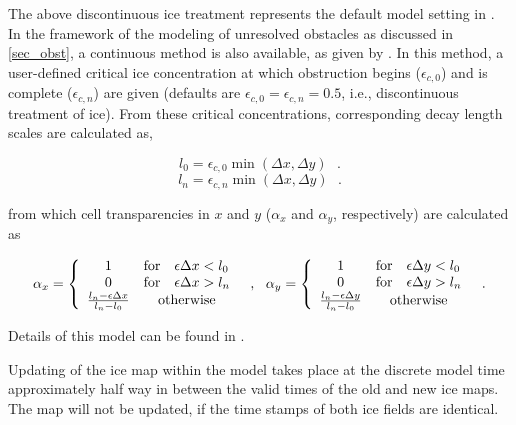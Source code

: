 The above discontinuous ice treatment represents the default model setting in
\ws. In the framework of the modeling of unresolved obstacles as discussed in
\para\ref{sec_obst}, a continuous method is also available, as given by
\cite{tol:OMOD03a}. In this method, a user-defined critical ice concentration
at which obstruction begins ($\epsilon_{c,0}$) and is complete
($\epsilon_{c,n}$) are given (defaults are $\epsilon_{c,0} = \epsilon_{c,n} =
0.5$, i.e., discontinuous treatment of ice). From these critical
concentrations, corresponding decay length scales are calculated as,

\begin{equation}
l_0 = \epsilon_{c,0} \min ( \Delta x , \Delta y )
\:\:\: . \label{eq:l0}
\end{equation}
\begin{equation}
l_n = \epsilon_{c,n} \min ( \Delta x , \Delta y )
\:\:\: . \label{eq:ln}
\end{equation}

\noindent
from which cell transparencies in $x$ and $y$ ($\alpha_x$ and $\alpha_y$,
respectively) are calculated as

\begin{equation}
\alpha_x = \left \{ \begin{array}{ccl}
 1 & \mbox{for} & \epsilon \Delta x < l_0 \\
 0 & \mbox{for} & \epsilon \Delta x > l_n \\
\frac{l_n - \epsilon \Delta x}{l_n - l_0} & \multicolumn{2}{c}{\mbox{otherwise}} 
\end{array} \right .
\:\:\: , \:\:\:
\alpha_y = \left \{ \begin{array}{ccl}
 1 & \mbox{for} & \epsilon \Delta y < l_0 \\
 0 & \mbox{for} & \epsilon \Delta y > l_n \\
\frac{l_n - \epsilon \Delta y}{l_n - l_0} & \multicolumn{2}{c}{\mbox{otherwise}} 
\end{array} \right .
\:\:\: . \label{eq:ice_0} 
\end{equation}

\noindent
Details of this model can be found in \cite{tol:OMOD03a}.

Updating of the ice map within the model takes place at the discrete model
time approximately half way in between the valid times of the old and new ice
maps. The map will not be updated, if the time stamps of both ice fields are
identical.


\vssub
